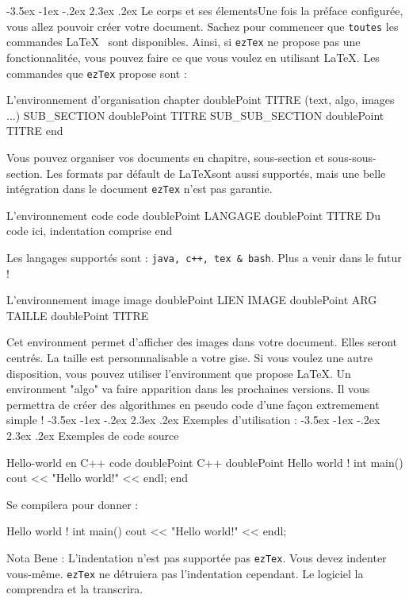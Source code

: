 \documentclass[11pt, a4paper]{article}
\makeatletter
\renewcommand{\section}{\@startsection{section}{1}{\z@}%
          {-3.5ex \@plus -1ex \@minus -.2ex}%
          {2.3ex \@plus .2ex}%
          {\reset@font\Large\bfseries	}}
\renewcommand{\subsection}{\@startsection{subsection}{1}{\z@}%
          {-3.5ex \@plus -1ex \@minus -.2ex}%
          {2.3ex \@plus .2ex}%
          {\reset@font\large\bfseries}}
\renewcommand{\subsubsection}{\@startsection{subsubsection}{1}{\z@}%
          {-3.5ex \@plus -1ex \@minus -.2ex}%
          {2.3ex \@plus .2ex}%
          {\reset@font\large\bfseries}}
\makeatother
\begin{document}
\subsubsection{Le corps et ses élements}Une fois la préface configurée, vous allez pouvoir créer votre document. Sachez pour commencer que \texttt{toutes} les commandes \LaTeX~ sont disponibles.
Ainsi, si \texttt{ezTex} ne propose pas une fonctionnalitée, vous pouvez faire ce que vous voulez en utilisant \LaTeX. \newline
Les commandes que \texttt{ezTex} propose sont :
\begin{bashCode}{L'environnement d'organisation} 
chapter doublePoint TITRE
	(text, algo, images ...)
	SUB_SECTION doublePoint TITRE
	SUB_SUB_SECTION doublePoint TITRE
end
\end{bashCode} 
Vous pouvez organiser vos documents en chapitre, sous-section et sous-sous-section. Les formats par défault de \LaTeX sont aussi supportés, mais
une belle intégration dans le document \texttt{ezTex} n'est pas garantie. \newline
\begin{bashCode}{L'environnement code} 
code doublePoint LANGAGE doublePoint TITRE
	Du code ici, indentation
		comprise
end
\end{bashCode} 
Les langages supportés sont : \texttt{java, c++, tex \& bash}. Plus a venir dans le futur ! \newline
\begin{bashCode}{L'environnement image} 
image doublePoint LIEN IMAGE doublePoint ARG TAILLE doublePoint TITRE
\end{bashCode} 
Cet environment permet d'afficher des images dans votre document. Elles seront centrés. La taille est personnnalisable a votre gise. Si vous voulez une autre
disposition, vous pouvez utiliser l'environment que propose \LaTeX. \newline
Un environment "algo" va faire apparition dans les prochaines versions. Il vous permettra de créer des algorithmes en pseudo code d'une façon extremement simple !
\newpage
\section{Exemples d'utilisation :} 
\subsection{Exemples de code source}\begin{bashCode}{Hello-world en C++} 
code doublePoint C++ doublePoint Hello world !
	int main(){
		cout << "Hello world!" << endl;
	}
end
\end{bashCode} 
Se compilera pour donner :
\begin{cppCode}{Hello world !} 
int main(){
	cout << "Hello world!" << endl;
}
\end{cppCode} 
Nota Bene : L'indentation n'est pas supportée pas \texttt{ezTex}. Vous devez indenter vous-même. \texttt{ezTex} ne détruiera pas l'indentation cependant.
Le logiciel la comprendra et la transcrira. \newline
\end{document}
